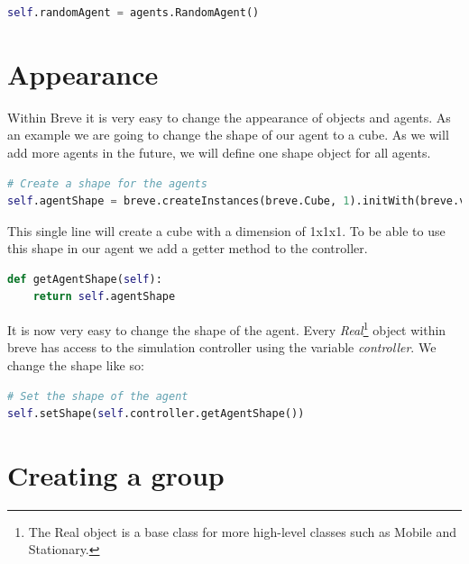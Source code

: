 \begin{lstlisting}[language=Python]
self.randomAgent = agents.RandomAgent()
\end{lstlisting}

\section{Appearance}

Within Breve it is very easy to change the appearance of objects and agents. As an example we are going to change the shape of our agent to a cube. As we will add more agents in the future, we will define one shape object for all agents.

\begin{fullwidth}
\begin{lstlisting}[language=Python]
# Create a shape for the agents
self.agentShape = breve.createInstances(breve.Cube, 1).initWith(breve.vector(1,1,1))
\end{lstlisting}
\end{fullwidth}

This single line will create a cube with a dimension of 1x1x1. To be able to use this shape in our agent we add a getter method to the controller.

\begin{lstlisting}[language=Python]
def getAgentShape(self):
	return self.agentShape
\end{lstlisting}

It is now very easy to change the shape of the agent. Every \textit{Real}\footnote{The Real object is a base class for more high-level classes such as Mobile and Stationary.} object within breve has access to the simulation controller using the variable \textit{controller}. We change the shape like so:

\begin{lstlisting}[language=Python]
# Set the shape of the agent
self.setShape(self.controller.getAgentShape())
\end{lstlisting}


\section{Creating a group}

